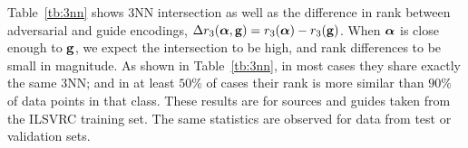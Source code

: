 \documentclass{article} %
\newcommand{\comment}[1]{}
\begin{document}
\comment{
We also consider rank statistics as a non-parametric way to quantify
similarity between internal representations of adversarial and guide images.
Along with the NN intersections, we compute the average distance to top $K$ NN.
We consider rank statistics as way of quantifying similarity between average
distances to the top NNs.  }

Table~\ref{tb:3nn} shows 3NN intersection as well as the difference in rank
between adversarial and guide encodings, $\Delta{r_{3}}(\boldsymbol{\mathbf{\alpha}},
\boldsymbol{\mathbf{g}})=r_{3} ({\boldsymbol{\mathbf{\alpha}}})-r_{3} ({\boldsymbol{\mathbf{g}}})$. When $\boldsymbol{\mathbf{\alpha}}$ is close enough to
$\boldsymbol{\mathbf{g}}$, we expect the intersection to be high, and rank differences to be
small in magnitude. As shown in Table~\ref{tb:3nn}, in most cases they share
exactly the same 3NN; and in at least $50\%$ of cases their rank is more
similar than $90\%$ of data points in that class.  These results are for
sources and guides taken from the ILSVRC training set.  The same statistics
are observed for data from test or validation sets.
\end{document}
